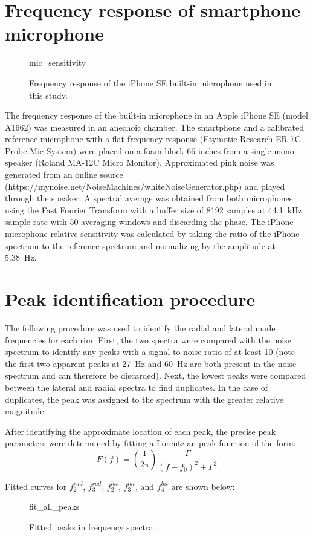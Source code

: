 \documentclass[../../thesis.tex]{subfiles}
\begin{document}
\section{Frequency response of smartphone microphone}
\label{app:mic_cal}

\begin{figure}[h]
\centering
{mic_sensitivity}
\caption{Frequency response of the iPhone SE built-in microphone used in this study.}
\label{fig:mic_sensitivity}
\end{figure}

The frequency response of the built-in microphone in an Apple iPhone SE (model A1662) was measured in an anechoic chamber. The smartphone and a calibrated reference microphone with a flat frequency response (Etymotic Research ER-7C Probe Mic System) were placed on a foam block 66 inches from a single mono speaker (Roland MA-12C Micro Monitor). Approximated pink noise was generated from an online source (https://mynoise.net/NoiseMachines/whiteNoiseGenerator.php) and played through the speaker. A spectral average was obtained from both microphones using the Fast Fourier Transform with a buffer size of 8192 samples at \SI{44.1}{kHz} sample rate with 50 averaging windows and discarding the phase. The iPhone microphone relative sensitivity was calculated by taking the ratio of the iPhone spectrum to the reference spectrum and normalizing by the amplitude at \SI{5.38}{Hz}.

\section{Peak identification procedure}
\label{app:peak_fits}

The following procedure was used to identify the radial and lateral mode frequencies for each rim: First, the two spectra were compared with the noise spectrum to identify any peaks with a signal-to-noise ratio of at least 10 (note the first two apparent peaks at \SI{27}{Hz} and \SI{60}{Hz} are both present in the noise spectrum and can therefore be discarded). Next, the lowest peaks were compared between the lateral and radial spectra to find duplicates. In the case of duplicates, the peak was assigned to the spectrum with the greater relative magnitude.

After identifying the approximate location of each peak, the precise peak parameters were determined by fitting a Lorentzian peak function of the form:
\begin{equation}
\label{eq:ema_peak_fit}
F(f) = \left(\frac{1}{2\pi}\right) \frac{\Gamma}{(f-f_0)^2 + \Gamma^2}
\end{equation}

Fitted curves for $f_2^{rad}$, $f_3^{rad}$, $f_2^{lat}$, $f_3^{lat}$, and $f_4^{lat}$ are shown below:

\begin{figure}
\centering
{fit_all_peaks}
\caption{Fitted peaks in frequency spectra}
\label{fig:ema_all_peaks}
\end{figure}
\end{document}
